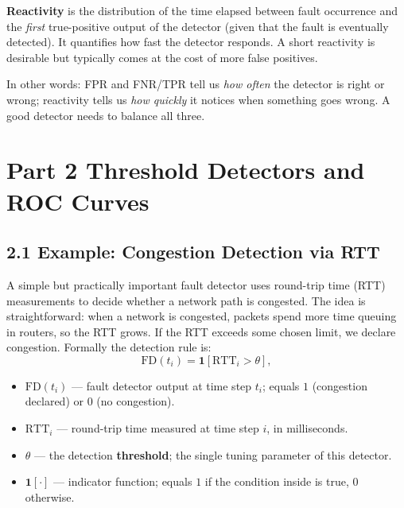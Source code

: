 \documentclass[12pt, a4paper]{article}
\begin{document}
\begin{defbox}
  \textbf{Reactivity} is the distribution of the time elapsed between
  fault occurrence and the \emph{first} true-positive output of the detector
  (given that the fault is eventually detected).
  It quantifies how fast the detector responds.
  A short reactivity is desirable but typically comes at the cost of more false
  positives.
\end{defbox}

In other words: FPR and FNR/TPR tell us \emph{how often} the detector is
right or wrong; reactivity tells us \emph{how quickly} it notices when something
goes wrong. A good detector needs to balance all three.

\section*{Part 2 \quad Threshold Detectors and ROC Curves}

\subsection*{2.1 \quad Example: Congestion Detection via RTT}

A simple but practically important fault detector uses round-trip time (RTT)
measurements to decide whether a network path is congested.
The idea is straightforward: when a network is congested, packets spend more
time queuing in routers, so the RTT grows. If the RTT exceeds some chosen
limit, we declare congestion. Formally the detection rule is:
\[
  \mathrm{FD}(t_i) = \mathbf{1}\!\left[\mathrm{RTT}_i > \theta\right],
\]
\begin{itemize}[leftmargin=1.4em, itemsep=2pt]
  \item $\mathrm{FD}(t_i)$ --- fault detector output at time step $t_i$; equals
    $1$ (congestion declared) or $0$ (no congestion).
  \item $\mathrm{RTT}_i$ --- round-trip time measured at time step $i$, in
    milliseconds.
  \item $\theta$ --- the detection \textbf{threshold}; the single tuning
    parameter of this detector.
  \item $\mathbf{1}[\cdot]$ --- indicator function; equals $1$ if the condition
    inside is true, $0$ otherwise.
\end{itemize}
\end{document}
